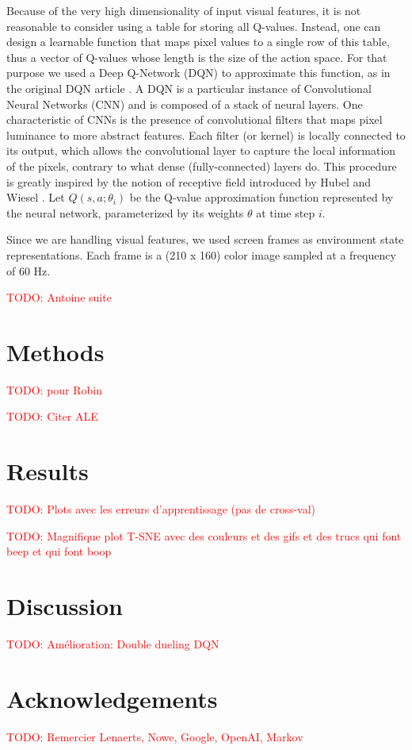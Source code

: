 \documentclass[letterpaper]{article}
\newcommand\todo[1]{\textcolor{red}{TODO: #1}}
\begin{document}
Because of the very high dimensionality of input visual features, it is not reasonable to consider using a table for storing all Q-values.
Instead, one can design a learnable function that maps pixel values to a single row of this table, thus a vector of Q-values whose length is the size
of the action space. For that purpose we used a Deep Q-Network (DQN) to approximate this function, as in the original DQN article \citep{Mnih2015}.
A DQN is a particular instance of Convolutional Neural Networks (CNN) and is composed of a stack of neural layers. One characteristic of CNNs is the
presence of convolutional filters that maps pixel luminance to more abstract features. Each filter (or kernel) is locally connected to its output, which
allows the convolutional layer to capture the local information of the pixels, contrary to what dense (fully-connected) layers do. This procedure is greatly
inspired by the notion of receptive field introduced by Hubel and Wiesel \citep{Hubel1962}.
Let $Q(s, a; \theta_i)$ be the Q-value approximation function represented by the neural network, parameterized by its weights $\theta$ at time step $i$.

Since we are handling visual features, we used screen frames as environment state representations. Each frame is a (210 x 160) color image sampled at
a frequency of 60 Hz.

  \todo{Antoine suite}

\section{Methods}

  \todo{pour Robin}

  \todo{Citer ALE} \citep{bellemare13arcade}

\section{Results}

  \todo{Plots avec les erreurs d'apprentissage (pas de cross-val)}

  \todo{Magnifique plot T-SNE avec des couleurs et des gifs et des trucs qui font beep et qui font boop} \citep{wattenberg2016how}

\section{Discussion}

  \todo{Amélioration: Double dueling DQN} \citep{DBLP:journals/corr/WangFL15}

\section{Acknowledgements}

  \todo{Remercier Lenaerts, Nowe, Google, OpenAI, Markov}

\footnotesize


\end{document}
